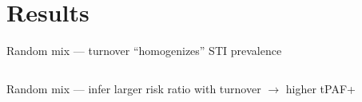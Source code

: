 \documentclass[aspectratio=169]{beamer}
\begin{document}
\section{Results}
\newif\iflabs
\newcommand{\results}[4]{%
  \setlength{\dz}{0.85\linewidth}\centering%
  \begin{tikzpicture}
    \node[anchor=south west] at (0,0) {\texttt{[image: \#2]}};
    \iflabs
      \visible<2->{\node at (0.225\dz,#3\dz) {\textbc{A}};}
      \visible<3->{\node at (0.715\dz,#4\dz) {\textbc{B}};}
    \fi
  \end{tikzpicture}\vspace{-1.5em}%
}
\begin{frame}{Random mix --- turnover ``homogenizes'' STI prevalence}
  \assofalse
  \begin{columns}
    \begin{column}{0.6\linewidth}%
      \only<1-3>{\labstrue\results{legend-min}{prev-ratio-main}{.29}{.22}}%
    \end{column}
    \begin{column}{0.2\linewidth}
      \centering{}
    \end{column}
    \begin{column}{0.2\linewidth}
      \centering{}
    \end{column}
  \end{columns}
\end{frame}
\begin{frame}{Random mix --- infer larger risk ratio with turnover $\rightarrow$ higher tPAF+}
  \assofalse
  \begin{columns}
    \begin{column}{0.6\linewidth}%
      \centering\visible<+->{}
      \xpar
      \begin{itemize}
      \end{itemize}
    \end{column}
    \begin{column}{0.2\linewidth}
      \centering{}
    \end{column}
    \begin{column}{0.2\linewidth}
      \centering{}
    \end{column}
  \end{columns}
\end{frame}
\end{document}
